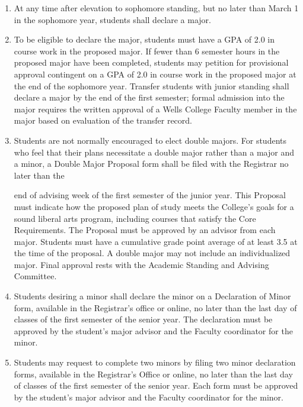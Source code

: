 \documentclass{manual}
\newcommand{\itemLevelA}{\alph*.}
\newcommand{\itemRefA}{\alph*}
\begin{document}
\begin{enumerate}[label=\itemLevelA,ref=\itemRefA]


\item At any time after elevation to sophomore standing, but no later than March 1 in the sophomore year, students shall declare a major.

\item To be eligible to declare the major, students must have a GPA of 2.0 in course work in the proposed major. If fewer than 6 semester hours in the proposed major have been completed, students may petition for provisional approval contingent on a GPA of 2.0 in course work in the proposed major at the end of the sophomore year. Transfer students with junior standing shall declare a major by the end of the first semester; formal admission into the major requires the written approval of a Wells College Faculty member in the major based on evaluation of the transfer record.

\item Students are not normally encouraged to elect double majors. For students who feel  that their plans necessitate a double major rather than a major and a minor,  a Double Major Proposal form shall be filed with the Registrar no later than the 

end of advising week of the first semester of the junior year. This Proposal must indicate how the proposed plan of study meets the College's goals for a sound liberal arts program, including courses that satisfy the Core Requirements. The Proposal must be approved by an advisor from each major. Students must have a cumulative grade point average of at least 3.5 at the time of the proposal. A double major may not include an individualized major. Final approval rests with the Academic Standing and Advising Committee.


\item Students desiring a minor shall declare the minor on a Declaration of Minor form, available in the Registrar's office or online, no later than the last day of classes of the first semester of the senior year. The declaration must be approved by the student's major advisor and the Faculty coordinator for the minor.

\item Students may request to complete two minors by filing two minor declaration forms, available in the Registrar's Office or online, no later than the last day of classes of the first semester of the senior year. Each form must be approved by the student's major advisor and the Faculty coordinator for the minor.
\end{enumerate}
\end{document}

